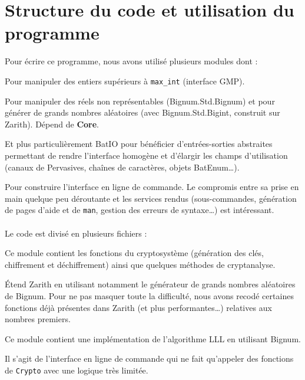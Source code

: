 \section{Structure du code et utilisation du programme}
\label{annexe_programme}

Pour écrire ce programme, nous avons utilisé plusieurs modules dont :
\\
\begin{description}[leftmargin=!,labelwidth=\widthof{\bfseries Cmdliner}]
\item[Zarith] Pour manipuler des entiers supérieurs à \lstinline|max_int| (interface GMP).
\item[Bignum] Pour manipuler des réels non représentables (Bignum.Std.Bignum) et pour générer de grands nombres aléatoires (avec Bignum.Std.Bigint, construit sur Zarith). Dépend de \textbf{Core}.
\item[Batteries] Et plus particulièrement BatIO pour bénéficier d'entrées-sorties abstraites permettant de rendre l'interface homogène et d'élargir les champs d'utilisation (canaux de Pervasives, chaînes de caractères, objets BatEnum…).
\item[Cmdliner] Pour construire l'interface en ligne de commande. Le compromis entre sa prise en main quelque peu déroutante et les services rendus (sous-commandes, génération de pages d'aide et de \texttt{man}, gestion des erreurs de syntaxe…) est intéressant.
\end{description}

\paragraph{} Le code est divisé en plusieurs fichiers :
\\

\begin{description}[leftmargin=!,labelwidth=\widthof{\bfseries \texttt{crypto.ml}}]
\item[\texttt{crypto.ml}] Ce module contient les fonctions du cryptosystème (génération des clés, chiffrement et déchiffrement) ainsi que quelques méthodes de cryptanalyse.
\item[\texttt{math.ml}] Étend Zarith en utilisant notamment le générateur de grands nombres aléatoires de Bignum. Pour ne pas masquer toute la difficulté, nous avons recodé certaines fonctions déjà présentes dans Zarith (et plus performantes…) relatives aux nombres premiers.
\item[\texttt{LLL.ml}] Ce module contient une implémentation de l'algorithme LLL en utilisant Bignum.
\item[\texttt{mh.ml}] Il s'agit de l'interface en ligne de commande qui ne fait qu'appeler des fonctions de \lstinline|Crypto| avec une logique très limitée.
\end{description}

